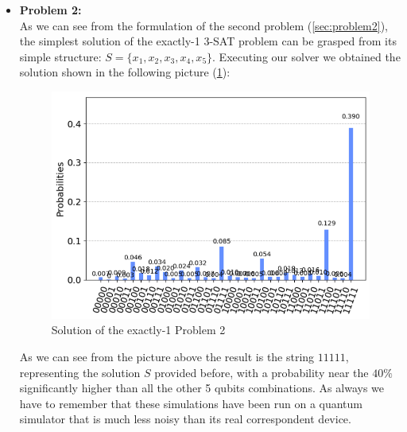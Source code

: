 \documentclass[english]{article}
\begin{document}
\begin{itemize}
					\item \textbf{Problem 2:} \\
						As we can see from the formulation of the second problem (\ref{sec:problem2}), the simplest solution of the exactly-1 3-SAT problem can be grasped from its simple structure: $S=\{x_1, x_2, x_3, x_4, x_5\}$.  Executing our solver we obtained the solution shown in the following picture (\ref{fig:problem2Solution}):
						\begin{figure}[h]
							\centering
							\includegraphics[scale=0.7]{Problem_2_Solution.png}
							\caption{
								\label{fig:problem2Solution}
								Solution of the exactly-1 Problem 2
							}
						\end{figure}
					
						As we can see from the picture above the result is the string $11111$, representing the solution $S$ provided before, with a probability near the $40\%$ significantly higher than all the other 5 qubits combinations. As always we have to remember that these simulations have been run on a quantum simulator that is much less noisy than its real correspondent device.
					

\end{itemize}
\end{document}
